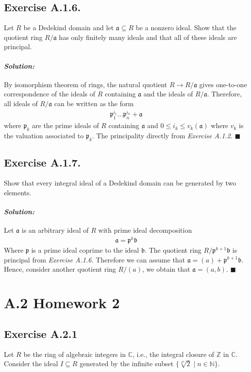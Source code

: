 \documentclass[12pt, a4paper]{article}
\newenvironment{solution}
  {\paragraph{\textit{Solution:}}\par\medskip}
  {\hfill$\blacksquare$\vspace{0.1cm}}
\begin{document}
\subsection*{Exercise A.1.6.} 
Let $R$ be a Dedekind domain and let $\mathfrak{a} \subseteq R$ be a nonzero ideal. Show that the quotient ring $R/\mathfrak{a}$ has only finitely many ideals and that all of these ideals are principal.
\begin{solution}
    By isomorphism theorem of rings, the natural quotient $R\to R/\mathfrak{a}$ gives one-to-one correspondence of the ideals of $R$ containing $\mathfrak{a}$ and the ideals of $R/\mathfrak{a}$.
    Therefore, all ideals of $R/\mathfrak{a}$ can be written as the form 
    \begin{align*}
        \mathfrak{p}_1^{i_1}\dots \mathfrak{p}_n^{i_n} + \mathfrak{a}
    \end{align*}
    where $\mathfrak{p}_k$ are the prime ideals of $R$ containing $\mathfrak{a}$ and $0\le i_k\le v_k(\mathfrak{a})$ where $v_k$ is the valuation associated to $\mathfrak{p}_k$.
    The principality directly from \textit{Exercise A.1.2.}
\end{solution}
\subsection*{Exercise A.1.7.} 
Show that every integral ideal of a Dedekind domain can be generated by two elements.
\begin{solution}
    Let $\mathfrak{a}$ is an arbitrary ideal of $R$ with prime ideal decomposition
    \begin{align*}
        \mathfrak{a} = \mathfrak{p}^k\mathfrak{b}
    \end{align*}
    Where $\mathfrak{p}$ is a prime ideal coprime to the ideal $\mathfrak{b}$.
    The quotient ring $R/\mathfrak{p}^{k+1}\mathfrak{b}$ is principal from \textit{Exercise A.1.6.} Therefore
    we can assume that $\mathfrak{a} = (a)+\mathfrak{p}^{k+1}\mathfrak{b}$. Hence, consider another quotient ring $R/(a)$, we obtain that $\mathfrak{a}=(a,b)$. 
\end{solution}

\section*{A.2 \quad Homework 2}
\subsection*{Exercise A.2.1}
Let $R$ be the ring of algebraic integers in $\mathbb{C}$, i.e., the integral closure of $\mathbb{Z}$ in $\mathbb{C}$. Consider the ideal $I \subseteq R$ generated by the infinite subset $\{\sqrt[2^n]{2} \mid n \in \mathbb{N}\}$. 
\end{document}
